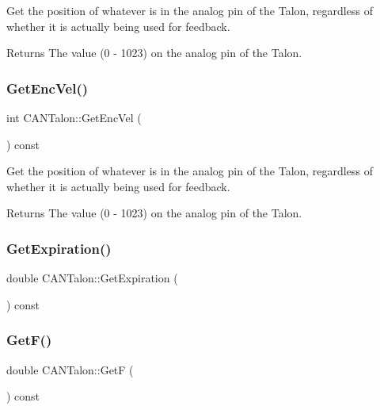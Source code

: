 Get the position of whatever is in the analog pin of the Talon, regardless of whether it is actually being used for feedback.

\begin{DoxyReturn}{Returns}
The value (0 -\/ 1023) on the analog pin of the Talon. 
\end{DoxyReturn}
\mbox{\label{class_c_a_n_talon_a1ecf556f18bc6a61278e2d27408f25af}} 
\subsubsection{\texorpdfstring{Get\+Enc\+Vel()}{GetEncVel()}}
{\footnotesize\ttfamily int C\+A\+N\+Talon\+::\+Get\+Enc\+Vel (\begin{DoxyParamCaption}{ }\end{DoxyParamCaption}) const\hspace{0.3cm}{\ttfamily [virtual]}}

Get the position of whatever is in the analog pin of the Talon, regardless of whether it is actually being used for feedback.

\begin{DoxyReturn}{Returns}
The value (0 -\/ 1023) on the analog pin of the Talon. 
\end{DoxyReturn}
\mbox{\label{class_c_a_n_talon_ae81697fca7c681183e25dceee64c6c26}} 
\subsubsection{\texorpdfstring{Get\+Expiration()}{GetExpiration()}}
{\footnotesize\ttfamily double C\+A\+N\+Talon\+::\+Get\+Expiration (\begin{DoxyParamCaption}{ }\end{DoxyParamCaption}) const\hspace{0.3cm}{\ttfamily [override]}}

\mbox{\label{class_c_a_n_talon_a568bfe876c2915efde9662976107365e}} 
\subsubsection{\texorpdfstring{Get\+F()}{GetF()}}
{\footnotesize\ttfamily double C\+A\+N\+Talon\+::\+GetF (\begin{DoxyParamCaption}{ }\end{DoxyParamCaption}) const\hspace{0.3cm}{\ttfamily [virtual]}}

